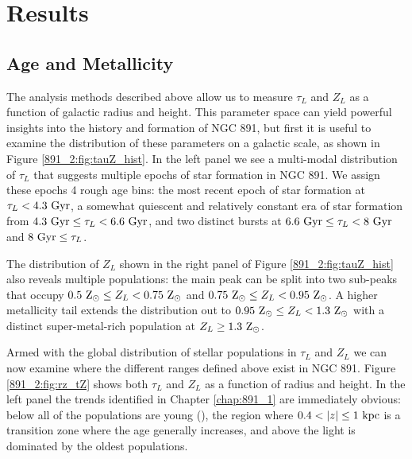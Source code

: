 \section{Results}
\label{891_2:sec:results}

\subsection{Age and Metallicity}
\label{891_2:sec:tZ}

The analysis methods described above allow us to measure $\tau_L$ and
$Z_L$ as a function of galactic radius and height. This parameter
space can yield powerful insights into the history and formation of
NGC 891, but first it is useful to examine the distribution of these
parameters on a galactic scale, as shown in Figure
\ref{891_2:fig:tauZ_hist}. In the left panel we see a multi-modal
distribution of $\tau_L$ that suggests multiple epochs of star
formation in NGC 891. We assign these epochs 4 rough age bins: the
most recent epoch of star formation at $\tau_L < 4.3~\mathrm{Gyr} $, a
somewhat quiescent and relatively constant era of star formation from
$4.3~\mathrm{Gyr} \leq\tau_L < 6.6~\mathrm{Gyr} $, and two distinct bursts
at $6.6~\mathrm{Gyr} \leq\tau_L < 8~\mathrm{Gyr} $ and
$8~\mathrm{Gyr} \leq\tau_L$.

The distribution of $Z_L$ shown in the right panel of Figure
\ref{891_2:fig:tauZ_hist} also reveals multiple populations: the main
peak can be split into two sub-peaks that occupy $0.5~\mathrm{\mathrm{Z}_{\odot}} \leq
Z_L < 0.75~\mathrm{\mathrm{Z}_{\odot}} $ and $0.75~\mathrm{\mathrm{Z}_{\odot}} \leq Z_L <
0.95~\mathrm{\mathrm{Z}_{\odot}} $. A higher metallicity tail extends the distribution
out to $0.95~\mathrm{\mathrm{Z}_{\odot}} \leq Z_L < 1.3~\mathrm{\mathrm{Z}_{\odot}} $ with a distinct
super-metal-rich population at $Z_L \geq1.3~\mathrm{\mathrm{Z}_{\odot}} $.

Armed with the global distribution of stellar populations in $\tau_L$
and $Z_L$ we can now examine where the different ranges defined above
exist in NGC 891. Figure \ref{891_2:fig:rz_tZ} shows both $\tau_L$ and
$Z_L$ as a function of radius and height. In the left panel the trends
identified in Chapter \ref{chap:891_1} are immediately obvious: below
 all of the populations are young (),
the region where $0.4 < |z| \leq 1~\mathrm{kpc} $ is a transition zone
where the age generally increases, and above  the light is
dominated by the oldest populations.

